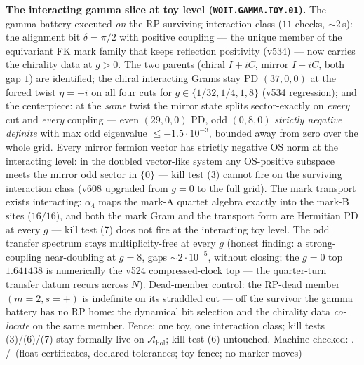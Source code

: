 \par\smallskip\noindent\textbf{The interacting gamma slice at toy level
(\texttt{WOIT.GAMMA.TOY.01}).}
The gamma battery executed \emph{on} the RP-surviving interaction
class ($11$ checks, ${\sim}2$\,s): the alignment bit $\delta=\pi/2$
with positive coupling --- the unique member of the equivariant FK
mark family that keeps reflection positivity (v534) --- now carries
the chirality data at $g>0$.  The two parents (chiral $I+iC$, mirror
$I-iC$, both gap $1$) are identified; the chiral interacting Grams
stay PD $(37,0,0)$ at the forced twist $\eta=+i$ on all four cuts
for $g\in\{1/32,1/4,1,8\}$ (v534 regression); and the centerpiece:
at the \emph{same} twist the mirror state splits sector-exactly on
\emph{every} cut and \emph{every} coupling --- even $(29,0,0)$ PD,
odd $(0,8,0)$ \emph{strictly negative definite} with max odd
eigenvalue $\le-1.5\cdot10^{-3}$, bounded away from zero over the
whole grid.  Every mirror fermion vector has strictly negative OS
norm at the interacting level: in the doubled vector-like system any
OS-positive subspace meets the mirror odd sector in $\{0\}$ ---
kill test (3) cannot fire on the surviving interaction class
(v608 upgraded from $g=0$ to the full grid).  The mark transport
exists interacting: $\alpha_4$ maps the mark-A quartet algebra
exactly into the mark-B sites ($16/16$), and both the mark Gram and
the transport form are Hermitian PD at every $g$ --- kill test (7)
does not fire at the interacting toy level.  The odd transfer
spectrum stays multiplicity-free at every $g$ (honest finding: a
strong-coupling near-doubling at $g=8$, gaps ${\sim}2\cdot10^{-5}$,
without closing; the $g=0$ top $1.641438$ is numerically the v524
compressed-clock top --- the quarter-turn transfer datum recurs
across $N$).  Dead-member control: the RP-dead member
$(m{=}2,s{=}+)$ is indefinite on its straddled cut --- off the
survivor the gamma battery has no RP home: the dynamical bit
selection and the chirality data \emph{co-locate} on the same
member.  Fence: one toy, one interaction class; kill tests
(3)/(6)/(7) stay formally live on $\mathcal A_{\mathrm{hol}}$; kill
test (6) untouched.
Machine-checked: .
\mE/\mC\ (float certificates, declared tolerances; toy fence;
no marker moves)
\par\smallskip


